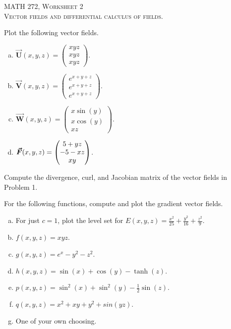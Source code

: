\documentclass[12pt]{article} %
\newcommand{\vecfieldV}{\boldsymbol{\vec{V}}}
\newcommand{\vecfieldU}{\boldsymbol{\vec{U}}}
\newcommand{\vecfieldW}{\boldsymbol{\vec{W}}}
\begin{document}
\begin{center}
   \textsc{\large MATH 272, Worksheet 2}\\
   \textsc{Vector fields and differential calculus of fields.}
\end{center}
\vspace{.5cm}


\begin{problem}
Plot the following vector fields.
\begin{multicols}{2}
\begin{enumerate}[(a)]
    \item $\vecfieldU(x,y,z) = \begin{pmatrix} xyz \\ xyz \\ xyz \end{pmatrix}$.
    \item $\vecfieldV(x,y,z) = \begin{pmatrix} e^{x+y+z} \\ e^{x+y+z} \\ e^{x+y+z} \end{pmatrix}$.
    \item $\vecfieldW(x,y,z) = \begin{pmatrix} x \sin(y) \\ x \cos(y) \\ xz \end{pmatrix}$.
    \item $\boldsymbol{\vec{F}}(x,y,z) = \begin{pmatrix} 5 + yz \\ -5 -xz \\ xy \end{pmatrix}$.
\end{enumerate}
\end{multicols}
\end{problem}

\begin{problem}
Compute the divergence, curl, and Jacobian matrix of the vector fields in Problem 1.
\end{problem}

\begin{problem}
For the following functions, compute and plot the gradient vector fields. 
\begin{multicols}{2}
\begin{enumerate}[(a)]
    \item For just $c=1$, plot the level set for $E(x,y,z) = \frac{x^2}{25} + \frac{y^2}{16} + \frac{z^2}{9}$.
    \item $f(x,y,z) = xyz$.
    \item $g(x,y,z) = e^x-y^2-z^2$.
    \item $h(x,y,z) = \sin(x)+\cos(y)-\tanh(z)$.
    \item $p(x,y,z) = \sin^2(x)+\sin^2(y)-\frac{1}{2}\sin(z)$.
    \item $q(x,y,z) = x^2+xy+y^2+sin(yz)$.
    \item One of your own choosing.
\end{enumerate}
\end{multicols}
\end{problem}
\end{document}
